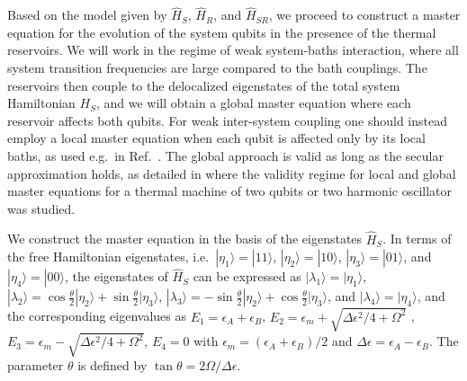 \documentclass[12pt]{iopart}
\newcommand{\ket}[1]{|#1\rangle}
\begin{document}
Based on the model given by $\hat{H}_S$, $\hat{H}_R$, and $\hat{H}_{SR}$, we proceed to construct a master equation for the evolution of the system qubits in the presence of the thermal reservoirs. We will work in the regime of weak system-baths interaction, where all system transition frequencies are large compared to the bath couplings. The reservoirs then couple to the delocalized eigenstates of the total system Hamiltonian $H_S$, and we will obtain a global master equation where each reservoir affects both qubits. For weak inter-system coupling one should instead employ a local master equation when each qubit is affected only by its local baths, as used e.g.~in Ref.~\cite{Brask2015}. The global approach is valid as long as the secular approximation holds, as detailed in \cite{Hofer2017} where the validity regime for local and global master equations for a thermal machine of two qubits or two harmonic oscillator was studied.

We construct the master equation in the basis of the eigenstates $\hat{H}_{S}$. In terms of the free Hamiltonian eigenstates, i.e.~$\ket{\eta_1} = \ket{11}$, $\ket{\eta_2} = \ket{10}$, $\ket{\eta_3} = \ket{01}$, and $\ket{\eta_4} = \ket{00}$, the eigenstates of $\hat{H}_{S}$ can be expressed as
$\ket{\lambda_1} = \ket{\eta_1}$,
$\ket{\lambda_2} = \cos\frac{\theta }{2} \ket{\eta_2} + \sin\frac{\theta }{2} \ket{\eta_3}$,
$\ket{\lambda_3} = - \sin\frac{\theta}{2} \ket{\eta_2} + \cos\frac{\theta }{2} \ket{\eta_3}$, and
$\ket{\lambda_4} = \ket{\eta_4}$,
and the corresponding eigenvalues as
$E_{1} = \epsilon_{A} + \epsilon_{B}$,
$E_{2} = \epsilon_{m} + \sqrt{\Delta\epsilon^2/4 + \Omega^2}$ ,
$E_{3} = \epsilon_{m} - \sqrt{\Delta\epsilon^2/4 + \Omega^2}$,
$E_{4} = 0$ with $\epsilon_{m}=(\epsilon_{A} + \epsilon_{B})/2$
and $\Delta\epsilon=\epsilon_{A} - \epsilon_{B} $.
The parameter $\theta$ is defined by $ \tan \theta = 2\Omega/ \Delta \epsilon $.
\end{document}
